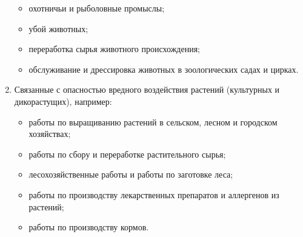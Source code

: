 \documentclass[a4paper, 12pt]{extarticle}
\begin{document}
\begin{enumerate}
\begin{itemize}
              \item охотничьи и рыболовные промыслы;
              \item убой животных;
              \item переработка сырья животного происхождения;
              \item обслуживание и дрессировка животных в зоологических садах и цирках.
          \end{itemize}
    \item Связанные с опасностью вредного воздействия растений (культурных и дикорастущих), например:
          \begin{itemize}
              \item работы по выращиванию растений в сельском, лесном и городском хозяйствах;
              \item работы по сбору и переработке растительного сырья;
              \item лесохозяйственные работы и работы по заготовке леса;
              \item работы по производству лекарственных препаратов и аллергенов из растений;
              \item работы по производству кормов.
          \end{itemize}
\end{enumerate}
\end{document}
